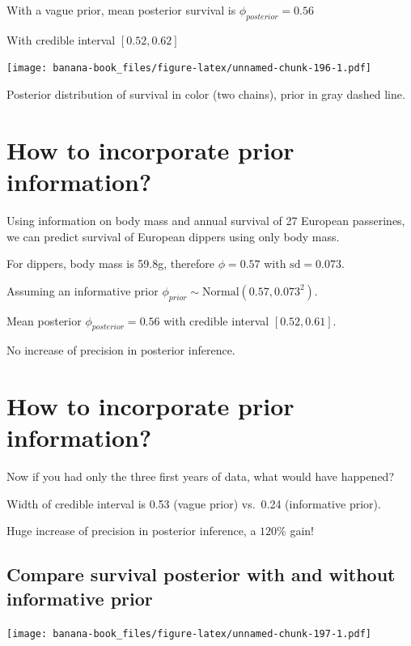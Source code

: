 \documentclass[
  12pt,
]{krantz}
\begin{document}
With a vague prior, mean posterior survival is \(\phi_{posterior} = 0.56\)

With credible interval \([0.52,0.62]\)

\texttt{[image: banana-book\_files/figure-latex/unnamed-chunk-196-1.pdf]}

Posterior distribution of survival in color (two chains), prior in gray dashed line.

\hypertarget{how-to-incorporate-prior-information}{%
\section{How to incorporate prior information?}\label{how-to-incorporate-prior-information}}

Using information on body mass and annual survival of 27 European passerines, we can predict survival of European dippers using only body mass.

For dippers, body mass is 59.8g, therefore \(\phi = 0.57\) with \(\text{sd} = 0.073\).

Assuming an informative prior \(\phi_{prior} \sim \text{Normal}(0.57,0.073^2)\).

Mean posterior \(\phi_{posterior} = 0.56\) with credible interval \([0.52, 0.61]\).

No increase of precision in posterior inference.

\hypertarget{how-to-incorporate-prior-information-1}{%
\section{How to incorporate prior information?}\label{how-to-incorporate-prior-information-1}}

Now if you had only the three first years of data, what would have happened?

Width of credible interval is 0.53 (vague prior) vs.~0.24 (informative prior).

Huge increase of precision in posterior inference, a \(120\%\) gain!

\hypertarget{compare-survival-posterior-with-and-without-informative-prior}{%
\subsection{Compare survival posterior with and without informative prior}\label{compare-survival-posterior-with-and-without-informative-prior}}

\texttt{[image: banana-book\_files/figure-latex/unnamed-chunk-197-1.pdf]}
\end{document}

